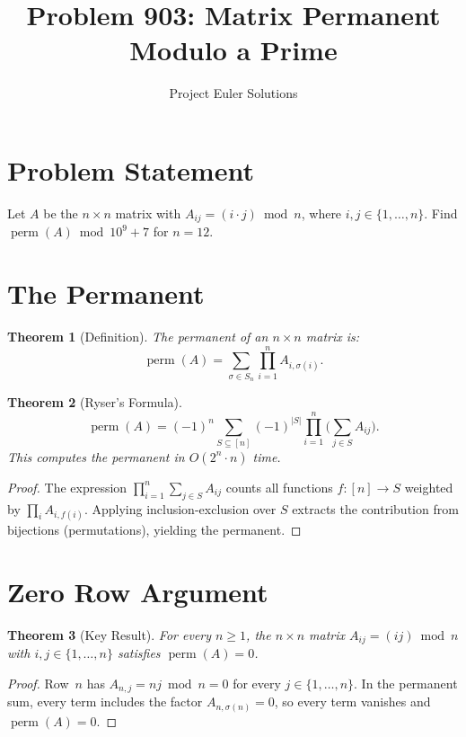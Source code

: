 \documentclass[11pt]{article}
\title{Problem 903: Matrix Permanent Modulo a Prime}
\author{Project Euler Solutions}
\date{}
\newtheorem{theorem}{Theorem}
\begin{document}
\maketitle

\section{Problem Statement}

Let $A$ be the $n \times n$ matrix with $A_{ij} = (i \cdot j) \bmod n$, where $i, j \in \{1, \ldots, n\}$. Find $\operatorname{perm}(A) \bmod 10^9+7$ for $n = 12$.

\section{The Permanent}

\begin{theorem}[Definition]
The permanent of an $n \times n$ matrix is:
\[
\operatorname{perm}(A) = \sum_{\sigma \in S_n} \prod_{i=1}^{n} A_{i,\sigma(i)}.
\]
\end{theorem}

\begin{theorem}[Ryser's Formula]
\[
\operatorname{perm}(A) = (-1)^n \sum_{S \subseteq [n]} (-1)^{|S|} \prod_{i=1}^{n} \biggl(\sum_{j \in S} A_{ij}\biggr).
\]
This computes the permanent in $O(2^n \cdot n)$ time.
\end{theorem}

\begin{proof}
The expression $\prod_{i=1}^n \sum_{j \in S} A_{ij}$ counts all functions $f\colon [n] \to S$ weighted by $\prod_i A_{i,f(i)}$. Applying inclusion-exclusion over $S$ extracts the contribution from bijections (permutations), yielding the permanent.
\end{proof}

\section{Zero Row Argument}

\begin{theorem}[Key Result]
\label{thm:zero}
For every $n \ge 1$, the $n \times n$ matrix $A_{ij} = (ij) \bmod n$ with $i,j \in \{1,\ldots,n\}$ satisfies $\operatorname{perm}(A) = 0$.
\end{theorem}

\begin{proof}
Row~$n$ has $A_{n,j} = nj \bmod n = 0$ for every $j \in \{1,\ldots,n\}$. In the permanent sum, every term includes the factor $A_{n,\sigma(n)} = 0$, so every term vanishes and $\operatorname{perm}(A) = 0$.
\end{proof}
\end{document}
